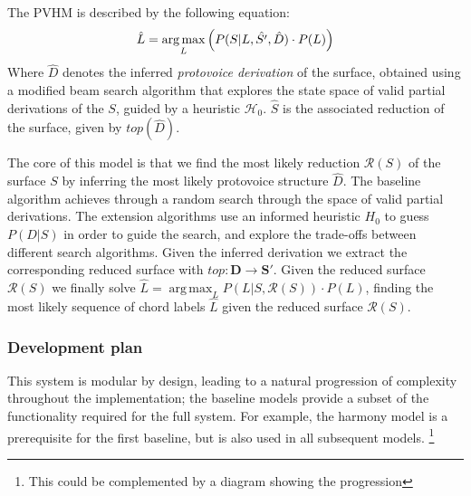 \documentclass[12pt,a4paper,twoside,openright]{report}
\DeclareMathOperator*{\argmax}{arg\,max}
\theoremstyle{definition}
\begin{document}
The PVHM is described by the following equation: 
\begin{equation}
  \label{eq:pvhmSuccinct}
  \begin{aligned}
    \hat{L} &= \argmax_L 
            \left( P(S|L,\hat{S'},\hat{D})\cdot P(L)\right) \\
  \end{aligned} \\
\end{equation}
Where $\hat{D}$ denotes the inferred \textit{protovoice derivation} of the surface, obtained using a modified beam search algorithm that explores the state space of valid partial derivations of the $S$, guided by a heuristic $\mathcal{H_0}$.  
$\hat{S}$ is the associated reduction of the surface, given by $top(\hat{D})$. 


The core of this model is that we find the most likely reduction $\mathcal{R}(S)$ of the surface $S$ by inferring the most likely protovoice structure $\hat{D}$. 
The baseline algorithm achieves through a random search through the space of valid partial derivations. 
The extension algorithms use an informed heuristic $H_0$ to guess $P(D|S)$ in order to guide the search, and explore the trade-offs between different search algorithms. 
Given the inferred derivation we extract the corresponding reduced surface with $top:\mathbf{D} \to \mathbf{S'}$. 
Given the reduced surface $\mathcal{R}(S)$ we finally solve $\hat{L} = \argmax_L P(L|S, \mathcal{R}(S)) \cdot P(L)$, finding the most likely sequence of chord labels $\hat{L}$ given the reduced surface $\mathcal{R}(S)$. 

\subsubsection{Development plan}
This system is modular by design, leading to a natural progression of complexity throughout the implementation; the baseline models provide a subset of the functionality required for the full system. For example, the harmony model is a prerequisite for the first baseline, but is also used in all subsequent models. \footnote{This could be complemented by a diagram showing the progression}
\end{document}
